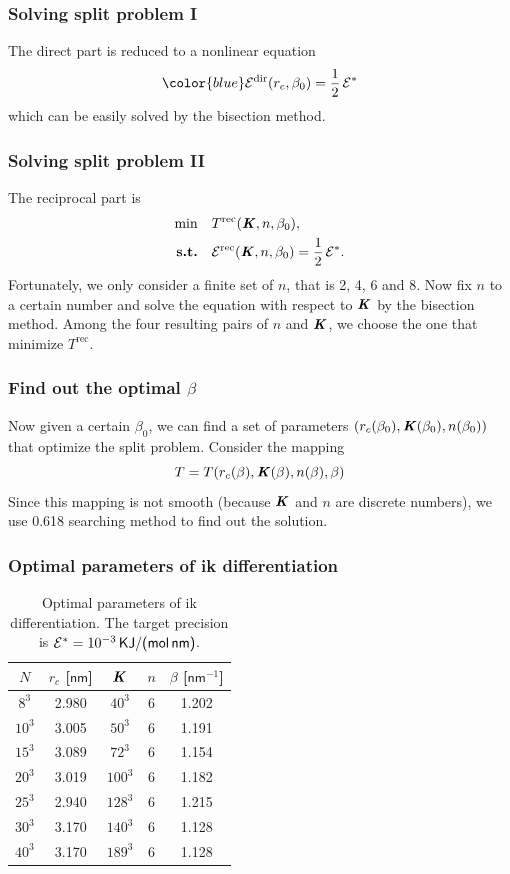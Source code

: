 \documentclass{beamer}
\newcommand{\redc}[1]{{\color{red} #1}}
\newcommand{\bluec}[1]{{\color{blue} #1}}
\renewcommand{\v}[1]{\textbf{\textit{#1}}}
\begin{document}
\begin{frame}
  \frametitle{Solving split problem I} \vfill
  The direct part is reduced to a nonlinear equation
  \begin{equation*}\bluec{
    \mathcal E^{\textrm{dir}} (r_c, \beta_0) = \frac12\, \mathcal E^\ast}
  \end{equation*}
  which can be easily solved by the \redc{bisection method}.
  \vfill
\end{frame}


\begin{frame}
  \frametitle{Solving split problem II} 
  The reciprocal part is
   \bluec{
  \begin{align*}
    \min\quad & T^{\textrm{rec}} (\v K, n, \beta_0), \\* 
    \textrm{\textbf{s.t.}}\quad & \mathcal E^{\textrm{rec}} (\v K, n,
    \beta_0) = \frac12\, \mathcal E^\ast.
  \end{align*}} 
Fortunately, we only consider a finite set of $n$, that is \redc{2, 4,
  6 and 8}. Now fix $n$ to a certain number and solve the equation
with respect to $\v K$ by the \redc{bisection method}. Among the four
resulting pairs of $n$ and $\v K$, we choose the one that minimize
$T^{\textrm{rec}}$.
\end{frame}

\begin{frame}
  \frametitle{Find out the optimal $\beta$ }
  \vfill
  Now given a certain $\beta_0$, we can find a set of parameters
  $(r_{c}(\beta_0), \v K(\beta_0), n (\beta_0))$ that optimize the
  split problem. 
  \vfill
  Consider the mapping 
  \bluec{$$T =  T(r_{c}(\beta), \v K(\beta), n (\beta), \beta)$$}
  Since this mapping is not smooth (because $\v K$ and $n$ are
  discrete numbers), we use \redc{0.618 searching method} to find out
  the solution.  \vfill
\end{frame}


\begin{frame}
  \frametitle{Optimal parameters of ik differentiation}
\begin{table}
  \centering
  \begin{tabular*}{0.6\textwidth}{@{\extracolsep{\fill}}ccccc}
    $N$    & $r_c$ [$\textsf{nm}$] & $\v K$ & $n$& $\beta$ [$\textsf{nm}^{-1}$]\\ \hline
    $8^3$ & 2.980 & $40^3$ & 6 & 1.202 \\
    $10^3$ & 3.005 & $50^3$ & 6 & 1.191  \\
    $15^3$ & 3.089 & $72^3$ & 6 & 1.154  \\
    $20^3$ & 3.019 & $100^3$ & 6 & 1.182  \\
    $25^3$ & 2.940 & $128^3$ & 6 & 1.215 \\
    $30^3$ & 3.170 & $140^3$ & 6 & 1.128  \\
    $40^3$ & 3.170 & $189^3$ & 6 & 1.128  
  \end{tabular*}
  \caption{
    Optimal parameters of ik differentiation. 
    The target precision is $\mathcal E^\ast=10^{-3}\,\textsf{KJ/(mol\,nm)}$.
  }
\end{table}
\end{frame}
\end{document}
